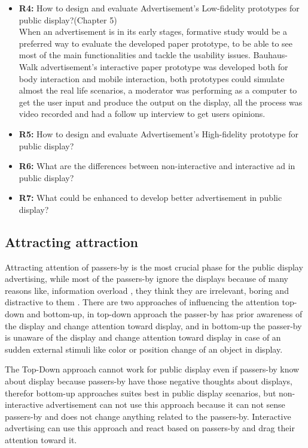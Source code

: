 \begin{itemize}
\item \textbf{R4: }How to design and evaluate Advertisement's Low-fidelity prototypes for public display?(Chapter 5) \\
When an advertisement is in its early stages, formative study would be a preferred way to evaluate the developed paper prototype, to be able to see most of the main functionalities and tackle the usability issues. Bauhaus-Walk advertisement’s interactive paper prototype was developed both for body interaction and mobile interaction, both prototypes could simulate almost the real life scenarios, a moderator was performing as a computer to get the user input and produce the output on the display, all the process was video recorded and had a follow up interview to get users opinions. 


\item \textbf{R5: }How to design and evaluate Advertisement's High-fidelity prototype for public display?
\item \textbf{R6: }What are the differences between non-interactive and interactive ad in public display?
\item \textbf{R7: }What could be enhanced to develop better advertisement in public display? 

\end{itemize}
\fi

\subsection{Attracting attraction}
Attracting attention of passers-by is the most crucial phase for the public display advertising, while most of the passers-by ignore the displays because of many reasons like, information overload \cite{Information_overload}, they think they are irrelevant, boring and distractive to them \cite{banner_blindness, display_blindness}. There are two approaches of influencing the attention top-down and bottom-up, in top-down approach the passer-by has prior awareness of the display and change attention toward display, and in bottom-up the passer-by is unaware of the display and change attention toward display in case of an sudden external stimuli like color \cite{Luminance} or position \cite{capturingattention} change of an object in display.  

The Top-Down approach cannot work for public display even if passers-by know about display because passers-by have those negative thoughts about displays, therefor bottom-up approaches suites best in public display scenarios, but non-interactive advertisement can not use this approach because it can not sense passers-by and does not change anything related to the passers-by. Interactive advertising can use this approach and react based on passers-by and drag their attention toward it.



